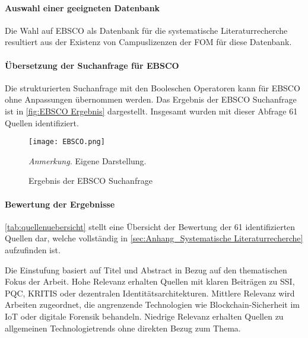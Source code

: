 \paragraph*{Auswahl einer geeigneten Datenbank}

Die Wahl auf \gls{EBSCO} als Datenbank für die systematische Literaturrecherche resultiert aus der Existenz von Campuslizenzen der FOM für diese Datenbank.

\paragraph*{Übersetzung der Suchanfrage für EBSCO}

Die strukturierten Suchanfrage mit den Booleschen Operatoren kann für
EBSCO ohne Anpassungen übernommen werden. Das Ergebnis der EBSCO Suchanfrage
ist in \autoref{fig:EBSCO Ergebnis} dargestellt. Insgesamt wurden mit dieser Abfrage 61 Quellen identifiziert.

\begin{figure}[H]
    \centering
    \texttt{[image: EBSCO.png]}
    \caption{Ergebnis der EBSCO Suchanfrage}
    \begin{flushleft}
    \textit{Anmerkung.} Eigene Darstellung.
    \end{flushleft}
    \label{fig:EBSCO Ergebnis}
\end{figure}

\paragraph*{Bewertung der Ergebnisse}

\autoref{tab:quellenuebersicht} stellt eine Übersicht der Bewertung der 61 identifizierten Quellen dar, welche vollständig in \ref{sec:Anhang_Systematische Literaturrecherche} aufzufinden ist.

Die Einstufung basiert auf Titel und Abstract in Bezug auf den thematischen Fokus der Arbeit. Hohe Relevanz erhalten Quellen mit klaren Beiträgen zu \ac{SSI}, \ac{PQC}, \ac{KRITIS} oder dezentralen Identitätsarchitekturen. Mittlere Relevanz wird Arbeiten zugeordnet, die angrenzende Technologien wie Blockchain-Sicherheit im \ac{IoT} oder digitale Forensik behandeln. Niedrige Relevanz erhalten Quellen zu allgemeinen Technologietrends ohne direkten Bezug zum Thema.

